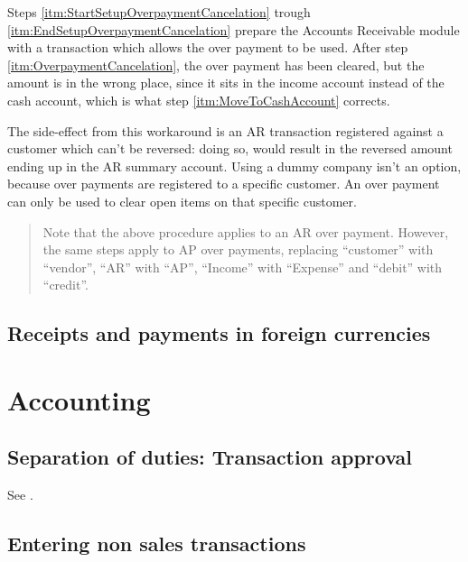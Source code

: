 Steps \ref{itm:StartSetupOverpaymentCancelation} trough \ref{itm:EndSetupOverpaymentCancelation}
prepare the Accounts Receivable module with a transaction which allows the over payment to be used.
After step \ref{itm:OverpaymentCancelation}, the over payment has been cleared, but the
amount is in the wrong place, since it sits in the income account instead of the cash account,
which is what step \ref{itm:MoveToCashAccount} corrects.

The side-effect from this workaround is an AR transaction registered against a \gls{customer} which can't
be reversed: doing so, would result in the reversed amount ending up in the AR summary account.  Using
a dummy company isn't an option, because over payments are registered to a specific \gls{customer}.  An
over payment can only be used to clear open items on that specific \gls{customer}.

\begin{quote}
Note that the above procedure applies to an AR over payment. However, the same steps apply to
AP over payments, replacing ``customer'' with ``vendor'', ``AR'' with ``AP'', ``Income'' with
``Expense'' and ``debit'' with ``credit''.
\end{quote}

\section{Receipts and payments in foreign currencies}
\label{sec-business-processes-payment-processing-fx-payments}

\chapter{Accounting}
\label{cha-business-processes-accounting}

\section{Separation of duties: Transaction approval}
\label{sec-business-processes-accounting-transaction-approval}

See .

\section{Entering non sales transactions}
\label{sec-business-processes-accounting-transaction-entry}

